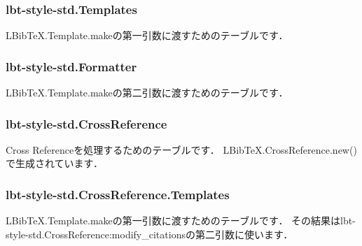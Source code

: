 \documentclass[a4paper]{ltjsarticle}
\begin{document}
\subsubsection{lbt-style-std.Templates}
LBibTeX.Template.makeの第一引数に渡すためのテーブルです．

\subsubsection{lbt-style-std.Formatter}
LBibTeX.Template.makeの第二引数に渡すためのテーブルです．

\subsubsection{lbt-style-std.CrossReference}
Cross Referenceを処理するためのテーブルです．
LBibTeX.CrossReference.new()で生成されています．

\subsubsection{lbt-style-std.CrossReference.Templates}
LBibTeX.Template.makeの第一引数に渡すためのテーブルです．
その結果はlbt-style-std.CrossReference:modify\_citationsの第二引数に使います．
\end{document}
